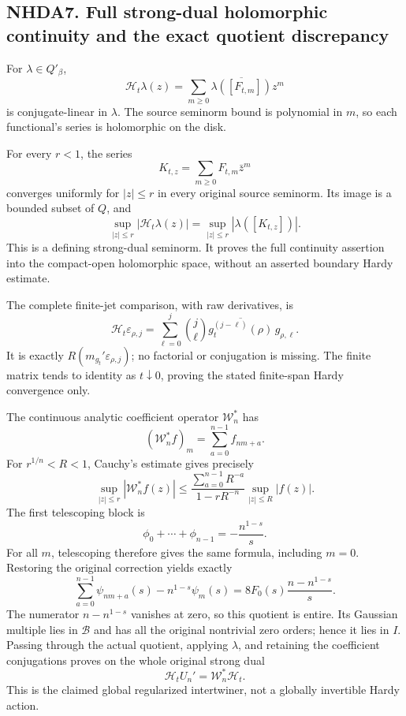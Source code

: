 \subsection{NHDA7. Full strong-dual holomorphic continuity and the exact
quotient
discrepancy}\label{nhda7.-full-strong-dual-holomorphic-continuity-and-the-exact-quotient-discrepancy}

For \(\lambda\in Q'_\beta\), \[
\mathcal H_t\lambda(z)=
\sum_{m\ge0}\overline{\lambda([F_{t,m}])}z^m
\] is conjugate-linear in \(\lambda\). The source seminorm bound is
polynomial in \(m\), so each functional's series is holomorphic on the
disk.

For every \(r<1\), the series \[
K_{t,z}=\sum_{m\ge0}F_{t,m}\bar z^m
\] converges uniformly for \(|z|\le r\) in every original source
seminorm. Its image is a bounded subset of \(Q\), and \[
\sup_{|z|\le r}|\mathcal H_t\lambda(z)|
=
\sup_{|z|\le r}|\lambda([K_{t,z}])|.
\] This is a defining strong-dual seminorm. It proves the full
continuity assertion into the compact-open holomorphic space, without an
asserted boundary Hardy estimate.

The complete finite-jet comparison, with raw derivatives, is \[
\mathcal H_t\varepsilon_{\rho,j}
=
\sum_{\ell=0}^j
\binom j\ell
\overline{g_t^{(j-\ell)}(\rho)}\,g_{\rho,\ell}.
\] It is exactly \(R(m_{g_t}'\varepsilon_{\rho,j})\); no factorial or
conjugation is missing. The finite matrix tends to identity as
\(t\downarrow0\), proving the stated finite-span Hardy convergence only.

The continuous analytic coefficient operator \(\mathscr W_n^*\) has \[
(\mathscr W_n^*f)_m=\sum_{a=0}^{n-1}f_{nm+a}.
\] For \(r^{1/n}<R<1\), Cauchy's estimate gives precisely \[
\sup_{|z|\le r}|\mathscr W_n^*f(z)|
\le
\frac{\sum_{a=0}^{n-1}R^{-a}}{1-rR^{-n}}
\sup_{|z|\le R}|f(z)|.
\] The first telescoping block is \[
\phi_0+\cdots+\phi_{n-1}=-\frac{n^{1-s}}s.
\] For all \(m\), telescoping therefore gives the same formula,
including \(m=0\). Restoring the original correction yields exactly \[
\sum_{a=0}^{n-1}\psi_{nm+a}(s)-n^{1-s}\psi_m(s)
=
8F_0(s)\frac{n-n^{1-s}}s.
\] The numerator \(n-n^{1-s}\) vanishes at zero, so this quotient is
entire. Its Gaussian multiple lies in \(\mathcal B\) and has all the
original nontrivial zero orders; hence it lies in \(I\). Passing through
the actual quotient, applying \(\lambda\), and retaining the coefficient
conjugations proves on the whole original strong dual \[
\mathcal H_tU_n'=\mathscr W_n^*\mathcal H_t.
\] This is the claimed global regularized intertwiner, not a globally
invertible Hardy action.

